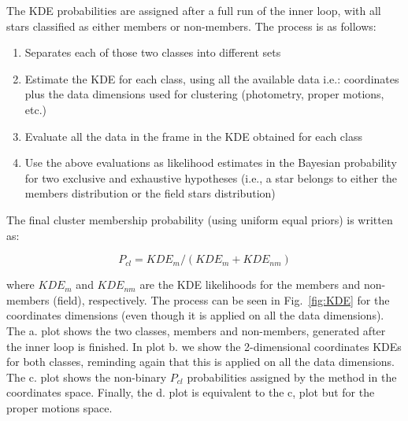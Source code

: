 \documentclass[draft]{aa}
\providecommand{\DIFaddtex}[1]{{\protect\color{blue}\uwave{#1}}} %
\providecommand{\DIFaddbegin}{} %
\providecommand{\DIFaddend}{} %
\providecommand{\DIFadd}[1]{\texorpdfstring{\DIFaddtex{#1}}{#1}} %
\newcommand{\DIFaddincludegraphics}[2][]{{\color{blue}\fbox{\DIFOincludegraphics[#1]{#2}}}} %
\DeclareRobustCommand{\DIFaddbegin}{\DIFOaddbegin \let\includegraphics\DIFaddincludegraphics} %
\DeclareRobustCommand{\DIFaddend}{\DIFOaddend \let\includegraphics\DIFOincludegraphics} %
\begin{document}
 The KDE probabilities are assigned after a full run of the inner loop, with
 all stars classified as either members or non-members. The process is as
 follows:

 \begin{enumerate}
  \item Separates each of those two classes into different sets
  \item Estimate the KDE for each class, using all the available data i.e.:
  coordinates plus the data dimensions used for clustering (photometry, proper
  motions, etc.)
  \item Evaluate all the data in the frame in the KDE obtained for each class
  \item Use the above evaluations as likelihood estimates in the Bayesian
  probability for two exclusive and exhaustive hypotheses (i.e., a star
  belongs to either the members distribution or the field stars distribution)
 \end{enumerate}

 The final cluster membership probability (using uniform equal priors) is
 written as:

 \begin{equation}
 P_{cl} = KDE_{m} / (KDE_{m} + KDE_{nm})
 \end{equation}

 \noindent where $KDE_{m}$ and $KDE_{nm}$ are the KDE likelihoods for the
 members and non-members (field), respectively. The process can be seen in
 Fig.~\ref{fig:KDE} for the coordinates dimensions (even though it is applied
 on all the data dimensions\DIFaddbegin \DIFadd{, described in Sect.~\ref{ssec:synthetic}}\DIFaddend ).
 The a. plot shows the two classes, members and
 non-members, generated after the inner loop is finished. In plot b. we show
 the 2-dimensional coordinates KDEs for both classes, reminding again that this
 is applied on all the data dimensions. The c. plot shows the
 non-binary $P_{cl} $ probabilities assigned by the method in the coordinates
 space. Finally, the d. plot is equivalent to the c, plot but for the proper
 motions space.
\end{document}
